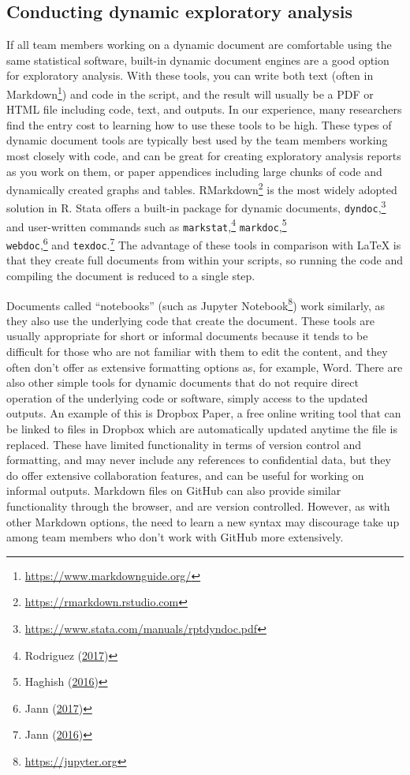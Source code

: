 \documentclass[
]{book}
\begin{document}
\hypertarget{conducting-dynamic-exploratory-analysis}{%
\subsection*{Conducting dynamic exploratory analysis}\label{conducting-dynamic-exploratory-analysis}}

If all team members working on a dynamic document are comfortable using the same statistical software,
built-in dynamic document engines are a good option for exploratory analysis.
With these tools,
you can write both text (often in Markdown\footnote{\url{https://www.markdownguide.org/}}) and code in the script,
and the result will usually be a PDF or HTML file including code, text, and outputs.
In our experience, many researchers find the entry cost to learning how to use these tools to be high.
These types of dynamic document tools are typically best used by the team members working most closely with code,
and can be great for creating exploratory analysis reports as you work on them,
or paper appendices including large chunks of code and dynamically created graphs and tables.
RMarkdown\footnote{\url{https://rmarkdown.rstudio.com}}
is the most widely adopted solution in R.
Stata offers a built-in package for dynamic documents, \texttt{dyndoc},\footnote{\url{https://www.stata.com/manuals/rptdyndoc.pdf}}
and user-written commands such as \texttt{markstat},\footnote{Rodriguez (\protect\hyperlink{ref-pr0067}{2017})}
\texttt{markdoc},\footnote{Haghish (\protect\hyperlink{ref-pr0064}{2016})}\\
\texttt{webdoc},\footnote{Jann (\protect\hyperlink{ref-pr0065}{2017})}
and \texttt{texdoc}.\footnote{Jann (\protect\hyperlink{ref-pr0062}{2016})}
The advantage of these tools in comparison with LaTeX is that
they create full documents from within your scripts,
so running the code and compiling the document is reduced to a single step.

Documents called ``notebooks''
(such as Jupyter Notebook\footnote{\url{https://jupyter.org}})
work similarly,
as they also use the underlying code that create the document.
These tools are usually appropriate for short or informal documents
because it tends to be difficult for those who are not familiar with them to edit the content,
and they often don't offer as extensive formatting options as, for example, Word.
There are also other simple tools for dynamic documents
that do not require direct operation of the underlying code or software,
simply access to the updated outputs.
An example of this is Dropbox Paper,
a free online writing tool that can be linked to files in Dropbox
which are automatically updated anytime the file is replaced.
These have limited functionality in terms of version control and formatting,
and may never include any references to confidential data,
but they do offer extensive collaboration features,
and can be useful for working on informal outputs.
Markdown files on GitHub can also provide similar functionality through the browser,
and are version controlled.
However, as with other Markdown options, the need to learn a new syntax may
discourage take up among team members who don't work with GitHub more extensively.
\end{document}
